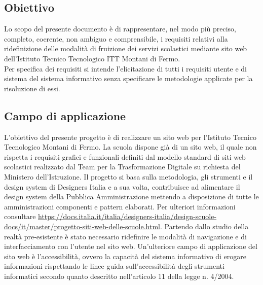 \documentclass{article}
\begin{document}
	 \subsection{\textbf{Obiettivo}} 
	\flushleft
	\normalsize
	Lo scopo del presente documento è di rappresentare, nel modo più preciso, completo, coerente, non  ambiguo e comprensibile, i requisiti relativi alla ridefinizione delle modalità di fruizione dei servizi scolastici mediante sito web dell'Istituto Tecnico Tecnologico ITT Montani di Fermo.\\ 
	Per specifica dei requisiti si intende l’elicitazione di tutti i requisiti utente e di sistema del sistema informativo senza specificare le metodologie applicate per la risoluzione di essi.
	
	\subsection{\textbf{Campo di applicazione}}
	L'obiettivo del presente progetto è di realizzare un sito web per l'Istituto Tecnico Tecnologico Montani di Fermo. La scuola dispone già di un sito web, il quale non rispetta i requisiti grafici e funzionali definiti dal modello standard di siti web scolastici realizzato dal Team per la Trasformazione Digitale su richiesta del Ministero dell'Istruzione. Il progetto si basa sulla metodologia, gli strumenti e il design system di Designers Italia e a sua volta, contribuisce ad alimentare il design system della Pubblica Amministrazione mettendo a disposizione di tutte le amministrazioni componenti e pattern elaborati. Per ulteriori informazioni consultare \url{https://docs.italia.it/italia/designers-italia/design-scuole-docs/it/master/progetto-siti-web-delle-scuole.html}. Partendo dallo studio della realtà pre-esistente è stato necessario ridefinire le modalità di navigazione e di interfacciamento con l'utente nel sito web. Un'ulteriore campo di applicazione del sito web è l'accessibilità, ovvero la capacità del sistema informativo di erogare informazioni rispettando le linee guida sull’accessibilità degli strumenti informatici secondo quanto descritto nell’articolo 11 della legge n. 4/2004.
	
	
\end{document}
